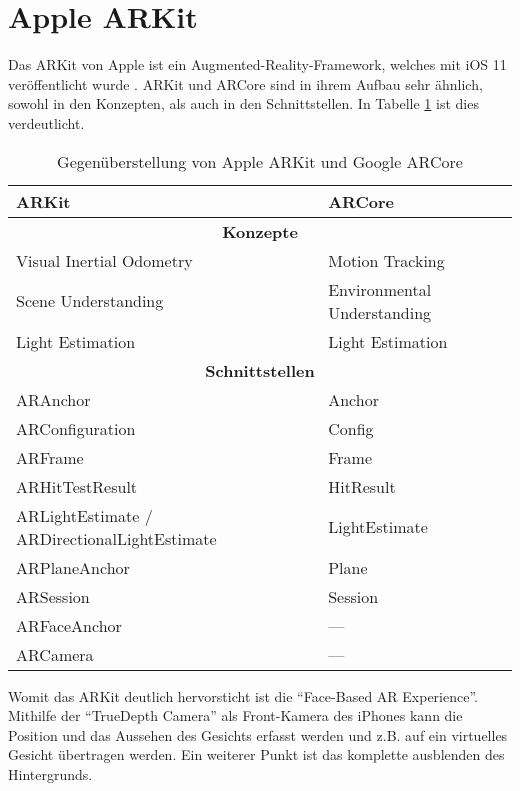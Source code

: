 
\section{Apple ARKit}
Das ARKit von Apple ist ein Augmented-Reality-Framework, welches mit iOS 11 veröffentlicht wurde \cite{apple_arkit}. ARKit und ARCore sind in ihrem Aufbau sehr ähnlich, sowohl in den Konzepten, als auch in den Schnittstellen. In Tabelle \ref{arkit_vs_arcore} ist dies verdeutlicht.

\begin{table}[h]
	\centering
	\begin{tabular}{|p{4cm}|p{4cm}|}
		\hline
		\textbf{ARKit} & \textbf{ARCore}\\
		\hline
		\multicolumn{2}{|c|}{\textbf{Konzepte}}\\
		\hline
		Visual Inertial Odometry & Motion Tracking\\
		Scene Understanding & Environmental Understanding\\
		Light Estimation & Light Estimation\\
		\hline
		\multicolumn{2}{|c|}{\textbf{Schnittstellen}}\\
		\hline
		ARAnchor & Anchor \\
		ARConfiguration & Config\\
		ARFrame & Frame\\
		ARHitTestResult & HitResult\\
		ARLightEstimate /
		\newline ARDirectionalLightEstimate & LightEstimate\newline\\
		ARPlaneAnchor & Plane\\
		ARSession & Session\\
		ARFaceAnchor & ---\\
		ARCamera & ---\\
		\hline
	\end{tabular}
	\caption{Gegenüberstellung von Apple ARKit und Google ARCore}
	\label{arkit_vs_arcore}
\end{table}

Womit das ARKit deutlich hervorsticht ist die "`Face-Based AR Experience"'. Mithilfe der "`TrueDepth Camera"' als Front-Kamera des iPhones kann die Position und das Aussehen des Gesichts erfasst werden und z.B. auf ein virtuelles Gesicht übertragen werden. Ein weiterer Punkt ist das komplette ausblenden des Hintergrunds.\cite{iphoneX}

